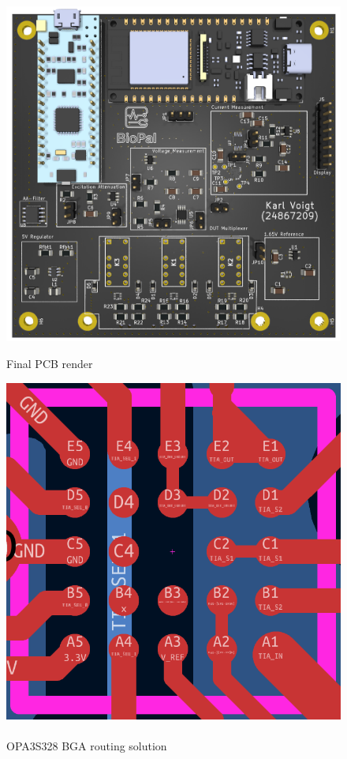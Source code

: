 \begin{figure}[H]
    \centering
    \begin{minipage}{0.4\textwidth}
        \centering
        \includegraphics[width=\textwidth]{BioPal_render.png}
        \caption{Final PCB render}
        \label{fig:final_pcb}
    \end{minipage}\hfill
    \begin{minipage}{0.35\textwidth}
        \centering
        \includegraphics[width=\textwidth]{BGA_Routing.png}
        \caption{\\OPA3S328 BGA routing solution}
        \label{fig:bga_routing}
    \end{minipage}
\end{figure}

